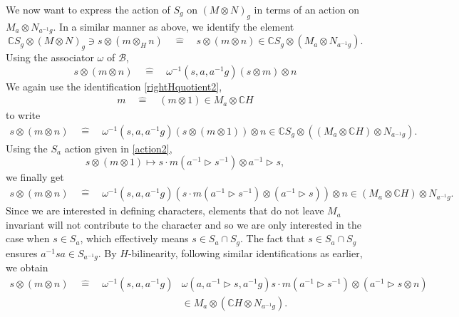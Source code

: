 \documentclass[11pt]{book}
\theoremstyle{Rem}
\theoremstyle{definition}
\numberwithin{equation}{section}
\newcommand\identify{\quad\hat{=}\quad}
\newcommand\hit{\triangleright}
\newcommand\inv{^{-1}}
\newcommand\ot{\otimes}
\newcommand\CC{\mathbb C}
\newcommand\B{\mathcal B}
\begin{document}
We now want to express the action of $S_g$ on $(M\ot N)_g$ in terms of an action on $M_a\ot N_{a\inv g}$. In a similar manner as above, we identify the element \begin{equation}
	\CC S_g \ot (M\ot N)_g \ni s\otimes (m\otimes_H n) \identify s\otimes (m \otimes n) \in \CC S_g \otimes (M_a \otimes N_{a\inv g}).	
\end{equation}
Using the associator $\omega$ of $\B$,
\begin{equation}
	s\otimes (m \otimes  n ) \identify  \omega\inv (s, a, a\inv g) (s\otimes m ) \otimes  n 
\end{equation}
We again use the identification \ref{rightHquotient2}, 
\begin{align}
	m \identify (m \otimes 1) \in M_a \otimes \CC H
\end{align} to write
\begin{align}
s\otimes (m \otimes  n ) \identify  \omega\inv (s, a, a\inv g) (s\otimes (m \ot 1)) \otimes  n \in  \CC S_g \otimes ((M_a\ot \CC H) \otimes N_{a\inv g}).
\end{align}
 Using the $ S_a$ action given in \ref{action2}, \begin{equation}
	s\otimes  (m \otimes 1)\mapsto   s\cdot m (a\inv \hit s\inv) \otimes a\inv \hit s,
\end{equation} we finally get \begin{align}
	s\otimes (m\ot n) \identify \omega \inv(s, a, a\inv g) (s\cdot m (a\inv\hit  s\inv ) \otimes (a\inv \hit s)) \otimes n \in (M_a \otimes \CC H) \otimes N_{a\inv g}.
	\end{align}
 Since we are interested in defining characters, elements that do not leave $M_a$ invariant will not contribute to the character and so we are only interested in the case when $s\in S_a$, which effectively means $s\in S_a\cap S_g$. The fact that $s\in S_a\cap S_g$ ensures $a\inv s a \in S_{a\inv g}$. By $H$-bilinearity, following similar identifications as earlier, we obtain
\begin{align}
s\otimes (m\otimes n)
	\identify  \omega \inv(s, a, a\inv g)&\omega (a, a\inv \hit s, a\inv g)s\cdot m (a\inv \hit s\inv)   \otimes (a\inv \hit s \otimes n) \\&\in M_a \otimes (\CC H \otimes N_{a\inv g}).\nonumber
\end{align}
\end{document}
